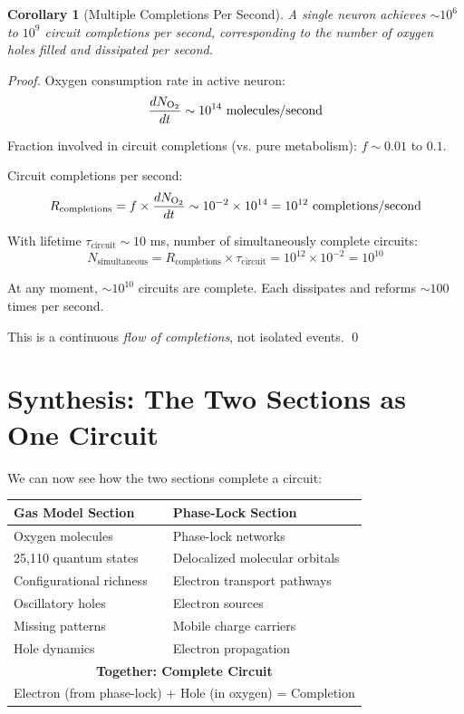 \documentclass[12pt,a4paper]{article}
\newtheorem{corollary}{Corollary}
\begin{document}
\begin{corollary}[Multiple Completions Per Second]
\label{cor:multiple_completions}
A single neuron achieves $\sim 10^6$ to $10^9$ circuit completions per second, corresponding to the number of oxygen holes filled and dissipated per second.
\end{corollary}

\begin{proof}
Oxygen consumption rate in active neuron:
\begin{equation}
\frac{dN_{\ce{O2}}}{dt} \sim 10^{14} \text{ molecules/second}
\end{equation}

Fraction involved in circuit completions (vs. pure metabolism): $f \sim 0.01$ to $0.1$.

Circuit completions per second:
\begin{equation}
R_{\text{completions}} = f \times \frac{dN_{\ce{O2}}}{dt} \sim 10^{-2} \times 10^{14} = 10^{12} \text{ completions/second}
\end{equation}

With lifetime $\tau_{\text{circuit}} \sim 10$ ms, number of simultaneously complete circuits:
\begin{equation}
N_{\text{simultaneous}} = R_{\text{completions}} \times \tau_{\text{circuit}} = 10^{12} \times 10^{-2} = 10^{10}
\end{equation}

At any moment, $\sim 10^{10}$ circuits are complete. Each dissipates and reforms $\sim 100$ times per second.

This is a continuous \textit{flow of completions}, not isolated events. \qed
\end{proof}

\section{Synthesis: The Two Sections as One Circuit}

We can now see how the two sections complete a circuit:

\begin{center}
\begin{tabular}{ll}
\toprule
\textbf{Gas Model Section} & \textbf{Phase-Lock Section} \\
\midrule
Oxygen molecules & Phase-lock networks \\
25,110 quantum states & Delocalized molecular orbitals \\
Configurational richness & Electron transport pathways \\
Oscillatory holes & Electron sources \\
Missing patterns & Mobile charge carriers \\
Hole dynamics & Electron propagation \\
\midrule
\multicolumn{2}{c}{\textbf{Together: Complete Circuit}} \\
\multicolumn{2}{c}{Electron (from phase-lock) + Hole (in oxygen) = Completion} \\
\bottomrule
\end{tabular}
\end{center}
\end{document}
